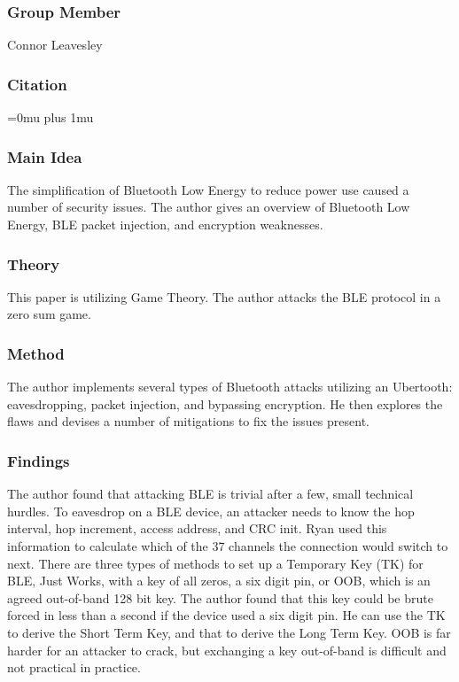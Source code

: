 \subsubsection{Group Member}

\noindent
Connor Leavesley

\noindent
\subsubsection{Citation}

\Urlmuskip=0mu plus 1mu\relax

\subsubsection{Main Idea}

\noindent
The simplification of Bluetooth Low Energy to reduce power use caused a number of security issues. The author gives an overview of Bluetooth Low Energy, BLE packet injection, and encryption weaknesses. 

\subsubsection{Theory}

\noindent
This paper is utilizing Game Theory. The author attacks the BLE protocol in a zero sum game. 

\subsubsection{Method}

\noindent
The author implements several types of Bluetooth attacks utilizing an Ubertooth: eavesdropping, packet injection, and bypassing encryption. He then explores the flaws and devises a number of mitigations to fix the issues present. 

\subsubsection{Findings}

\noindent
The author found that attacking BLE is trivial after a few, small technical hurdles. To eavesdrop on a BLE device, an attacker needs to know the hop interval, hop increment, access address, and CRC init. Ryan used this information to calculate which of the 37 channels the connection would switch to next. There are three types of methods to set up a Temporary Key (TK) for BLE, Just Works, with a key of all zeros, a six digit pin, or OOB, which is an agreed out-of-band 128 bit key. The author found that this key could be brute forced in less than a second if the device used a six digit pin. He can use the TK to derive the Short Term Key, and that to derive the Long Term Key. OOB is far harder for an attacker to crack, but exchanging a key out-of-band is difficult and not practical in practice. 

